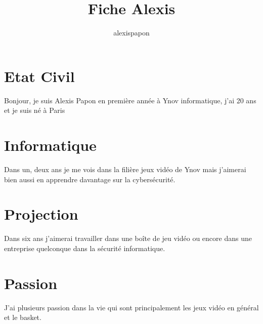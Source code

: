 \documentclass{article}
\title{Fiche Alexis}
\author{alexispapon }
\begin{document}
\maketitle

\section{Etat Civil}
Bonjour, je suis Alexis Papon en première année à Ynov informatique, j'ai 20 ans et je suis né à Paris

\section{Informatique}
Dans un, deux ans je me vois dans la filière jeux vidéo de Ynov mais j'aimerai bien aussi en apprendre davantage sur la cybersécurité.
\section{Projection}
Dans six ans j'aimerai travailler dans une boîte de jeu vidéo ou encore dans une entreprise quelconque dans la sécurité informatique.
\section{Passion}
J'ai plusieurs passion dans la vie qui sont principalement les jeux vidéo en général et le basket.
\end{document}
